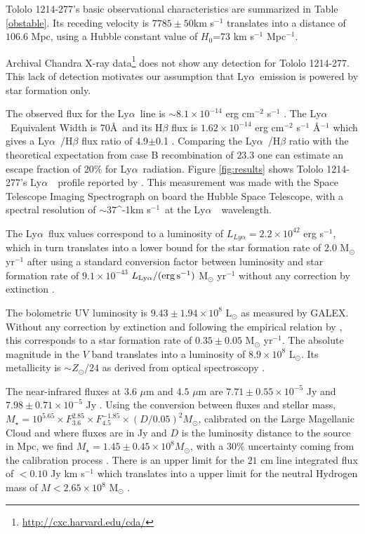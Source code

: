 \documentclass[a4paper,fleqn,usenatbib]{mnras}
\newcommand{\tol}{Tololo 1214-277}
\newcommand{\lya}{\ifmmode{{\rm Ly}\alpha}\else Ly$\alpha$\ \fi}
\newcommand{\kms}{\ifmmode\mathrm{km\ s}^{-1}\else km s$^{-1}$\fi}
\begin{document}
\tol's basic observational characteristics are summarized in Table \ref{obstable}.
Its receding velocity is $7785\pm 50$km s$^{-1}$ translates
into a distance of $106.6$ Mpc, using a Hubble constant value of $H_{0}$=73
km s$^{-1}$ Mpc$^{-1}$.

Archival Chandra X-ray data\footnote{\url{http://cxc.harvard.edu/cda/}} does not show any
detection for \tol. 
This lack of detection motivates our assumption that \lya emission is
powered by star formation only.

The observed flux for the \lya line is $\sim
8.1\times 10^{-14}$ erg cm$^{-2}$ s$^{-1}$ \citep{Thuan97}.
The \lya Equivalent Width is $70$\AA\ and its H$\beta$ flux is 
$1.62\times 10^{-14}$ erg cm$^{-2}$ s$^{-1}$ \AA$^{-1}$
which gives a \lya/H$\beta$ flux ratio of
4.9$\pm$0.1 \citep{Izotov04}.
Comparing the \lya/H$\beta$ ratio with the theoretical
expectation from case B recombination of $23.3$ \citep{Hummer1987} one
can estimate an escape fraction of $20$\% for \lya radiation.
Figure \ref{fig:results} shows \tol's \lya\ profile reported by
\cite{mashesse03}. This measurement was made with the Space Telescope
Imaging Spectrograph on board the Hubble Space Telescope, with a
spectral resolution of $\sim 37$\kms\ at the  \lya\ wavelength.  

The \lya flux values correspond to a luminosity of
$L_{Ly\alpha}=2.2\times 10^{42}$ erg s$^{-1}$, which in turn
translates  into a lower bound for the star formation rate of $2.0$
M$_{\odot}$ yr$^{-1}$ after using a standard conversion factor between
luminosity and star formation rate of $9.1\times 10^{-43}$
$L_{\rm Ly\alpha} / (\mathrm{erg}\,\mathrm{s}^{-1})$ M$_{\odot}$ yr$^{-1}$ 
without any
correction by extinction
\citep{Kennicutt98}.


The bolometric UV luminosity is $9.43\pm1.94 \times 10^{8}$
L$_{\odot}$ as measured by GALEX. Without any correction by extinction
and following the empirical relation by \cite{Kennicutt98}, this
corresponds to a star formation rate of $0.35\pm 0.05$ M$_{\odot}$
yr$^{-1}$. 
The absolute magnitude in the $V$ band translates into a luminosity of
$8.9\times 10^{8}$ L$_{\odot}$.  
Its metallicity is $\sim Z_{\odot}/24$ as derived from
optical spectroscopy \citep{Izotov04}. 
%

The near-infrared fluxes at $3.6$ $\mu$m and $4.5$ $\mu$m are
$7.71\pm0.55\times 10^{-5}$ Jy and $7.98\pm0.71\times 10^{-5}$ Jy
\citep{2008ApJ...678..804E}.
Using the conversion between fluxes and
stellar mass, $M_{\star} =
10^{5.65} \times F_{3.6}^{2.85} \times F_{4.5}^{-1.85} \times
(D/0.05)^2 M_{\odot}$,  calibrated on the Large Magellanic Cloud 
and  where fluxes are in Jy and $D$ is the luminosity
distance to the source in Mpc, we find $M_{\star} = 1.45\pm0.45\times 10^{8}
M_{\odot}$, with a $30\%$ uncertainty coming from the calibration
process \citep{2012AJ....143..139E}.  
There is an upper limit for the  $21$ cm line integrated flux of $<0.10$
Jy km s$^{-1}$  which translates into a upper limit for the neutral
Hydrogen mass of $M<2.65\times 10^{8}$ M$_{\odot}$
\citep{pustilnikmartin07}. 
\end{document}
